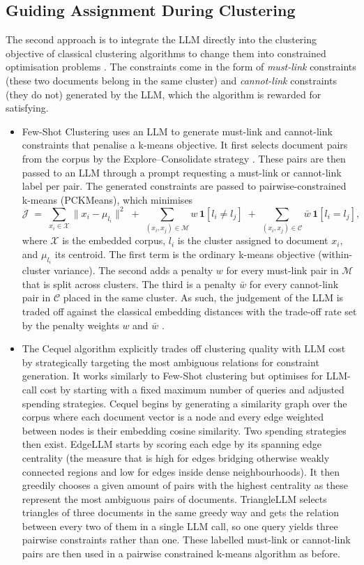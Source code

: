 \documentclass[11pt,a4paper,oneside]{report}
\begin{document}
\subsection{Guiding Assignment During Clustering}\label{sec:during}

The second approach is to integrate the LLM directly into the clustering objective of classical clustering algorithms to change them into constrained optimisation problems \citep{wagstaff2001constrained}. The constraints come in the form of \emph{must-link} constraints (these two documents belong in the same cluster) and \emph{cannot-link} constraints (they do not) generated by the LLM, which the algorithm is rewarded for satisfying.
\begin{itemize}
\item Few-Shot Clustering uses an LLM to generate must-link and cannot-link constraints that penalise a k-means objective. It first selects document pairs from the corpus by the Explore--Consolidate strategy \citep{basu2004active}. These pairs are then passed to an LLM through a prompt requesting a must-link or cannot-link label per pair. The generated constraints are passed to pairwise-constrained k-means (PCKMeans), which minimises
\[
\mathcal{J} \;=\; \sum_{x_i \in \mathcal{X}} \lVert x_i - \mu_{l_i} \rVert^2 \;+\; \sum_{(x_i, x_j) \in \mathcal{M}} w \,\mathbf{1}\!\left[ l_i \neq l_j \right] \;+\; \sum_{(x_i, x_j) \in \mathcal{C}} \bar{w} \,\mathbf{1}\!\left[ l_i = l_j \right],
\]
where $\mathcal{X}$ is the embedded corpus, $l_i$ is the cluster assigned to document $x_i$, and $\mu_{l_i}$ its centroid. The first term is the ordinary k-means objective (within-cluster variance). The second adds a penalty $w$ for every must-link pair in $\mathcal{M}$ that is split across clusters. The third is a penalty $\bar{w}$ for every cannot-link pair in $\mathcal{C}$ placed in the same cluster. As such, the judgement of the LLM is traded off against the classical embedding distances with the trade-off rate set by the penalty weights $w$ and $\bar{w}$ \citep{viswanathan2024fewshot}.
\item The Cequel algorithm \citep{wang2025cequel} explicitly trades off clustering quality with LLM cost by strategically targeting the most ambiguous relations for constraint generation. It works similarly to Few-Shot clustering but optimises for LLM-call cost by starting with a fixed maximum number of queries and adjusted spending strategies. Cequel begins by generating a similarity graph over the corpus where each document vector is a node and every edge weighted between nodes is their embedding cosine similarity. Two spending strategies then exist. EdgeLLM starts by scoring each edge by its spanning edge centrality (the measure that is high for edges bridging otherwise weakly connected regions and low for edges inside dense neighbourhoods). It then greedily chooses a given amount of pairs with the highest centrality as these represent the most ambiguous pairs of documents. TriangleLLM selects triangles of three documents in the same greedy way and gets the relation between every two of them in a single LLM call, so one query yields three pairwise constraints rather than one. These labelled must-link or cannot-link pairs are then used in a pairwise constrained k-means algorithm as before.

\end{itemize}
\end{document}
